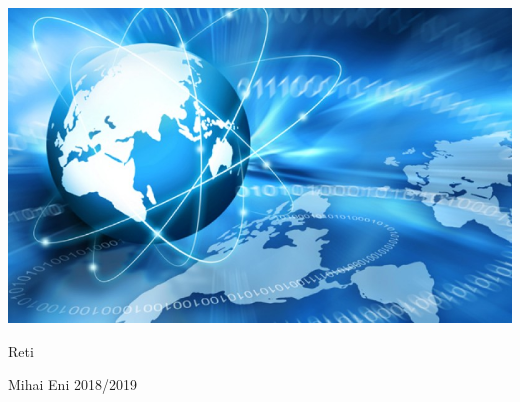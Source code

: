 \documentclass{article}
\begin{document}
    
    \begin{titlepage}
        \centering
        \includegraphics[scale=0.6]{reti.jpg}
        \par\vspace{4cm}
        
        {\fontsize{60}{1}\selectfont Reti}
        \par\vspace{3cm}
        {\fontsize{40}{1}\selectfont Mihai Eni}
        \vfill
        {\large{2018/2019}}
    \end{titlepage}

\tableofcontents
\end{document}
